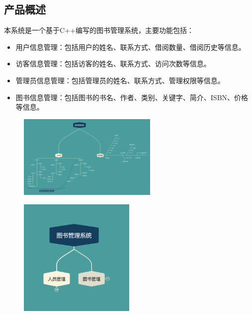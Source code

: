 \documentclass[12pt,twoside]{ctexart}
\begin{document}
\subsection{产品概述}
本系统是一个基于C++编写的图书管理系统，主要功能包括：
\begin{itemize}
    \item 用户信息管理：包括用户的姓名、联系方式、借阅数量、借阅历史等信息。
    \item 访客信息管理：包括访客的姓名、联系方式、访问次数等信息。
    \item 管理员信息管理：包括管理员的姓名、联系方式、管理权限等信息。
    \item 图书信息管理：包括图书的书名、作者、类别、关键字、简介、ISBN、价格等信息。

\end{itemize}

\begin{figure}[H]
    \centering
    \includegraphics[width=0.6\textwidth]{total.png}
\end{figure}

\begin{figure}[H]
    \centering
    \includegraphics[width=0.5\textwidth]{part (3).png}
\end{figure}
\end{document}
